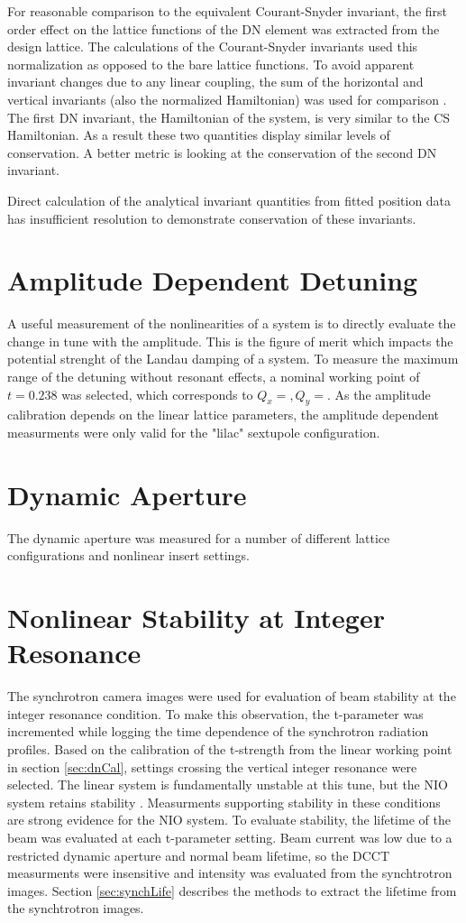 For reasonable comparison to the equivalent Courant-Snyder invariant, the first order effect on the lattice functions of the DN element was extracted from the design lattice. The calculations of the Courant-Snyder invariants used this normalization as opposed to the bare lattice functions. To avoid apparent invariant changes due to any linear coupling, the sum of the horizontal and vertical invariants (also the normalized Hamiltonian) was used for comparison \cite{leeAccelerator}. The first DN invariant, the Hamiltonian of the system, is very similar to the CS Hamiltonian. As a result these two quantities display similar levels of conservation. A better metric is looking at the conservation of the second DN invariant.

Direct calculation of the analytical invariant quantities from fitted position data has insufficient resolution to demonstrate conservation of these invariants.

\section{Amplitude Dependent Detuning} \label{sec:ampDetune}
A useful measurement of the nonlinearities of a system is to directly evaluate the change in tune with the amplitude. This is the figure of merit which impacts the potential strenght of the Landau damping of a system. To measure the maximum range of the detuning without resonant effects, a nominal working point of $t=0.238$ was selected, which corresponds to $Q_x = , Q_y = $. As the amplitude calibration depends on the linear lattice parameters, the amplitude dependent measurments were only valid for the "lilac" sextupole configuration. 

\section{Dynamic Aperture} \label{sec:DA}
The dynamic aperture was measured for a number of different lattice configurations and nonlinear insert settings.

\section{Nonlinear Stability at Integer Resonance} \label{sec:intCross}
The synchrotron camera images were used for evaluation of beam stability at the integer resonance condition. To make this observation, the t-parameter was incremented while logging the time dependence of the synchrotron radiation profiles. Based on the calibration of the t-strength from the linear working point in section \ref{sec:dnCal}, settings crossing the vertical integer resonance were selected. The linear system is fundamentally unstable at this tune, but the NIO system retains stability . Measurments supporting stability in these conditions are strong evidence for the NIO system. To evaluate stability, the lifetime of the beam was evaluated at each t-parameter setting. Beam current was low due to a restricted dynamic aperture and normal beam lifetime, so the DCCT measurments were insensitive and intensity was evaluated from the synchtrotron images. Section \ref{sec:synchLife} describes the methods to extract the lifetime from the synchtrotron images.


